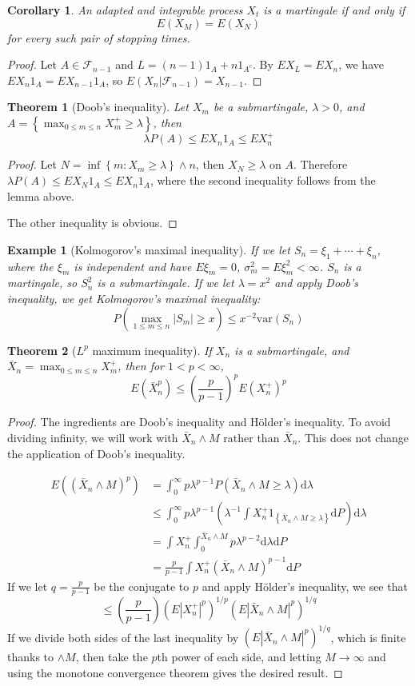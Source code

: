 \documentclass{article}
\newtheorem{Thm}{Theorem}[section]
\newtheorem{Cor}{Corollary}[Thm]
\newtheorem{Eg}{Example}[section]
\theoremstyle{definition}
\begin{document}
\begin{Cor}
    An adapted and integrable process $X_t$ is a martingale if and only if 
    \[E(X_M)=E(X_N)\] 
    for every such pair of stopping times.
\end{Cor}
\begin{proof}
    Let $A\in\mathcal{F}_{n-1}$ and $L=(n-1)1_A+n1_{A^c}$. By $EX_L=EX_n$, we have $EX_n1_A=EX_{n-1}1_A$,
    so $E(X_n|\mathcal{F}_{n-1})=X_{n-1}$.
\end{proof}


\begin{Thm}[Doob's inequality]
Let $X_m$ be a submartingale, $\lambda>0$, and $A=\left\{ \max_{0\le m\le n}X_m^+  \ge\lambda\right\}$, then \[\lambda P(A)\le EX_n1_A\le EX_n^+\]
\end{Thm}
\begin{proof}
Let $N=\inf\left\{m:X_m\ge\lambda\right\}\wedge n$, then $X_N\ge\lambda$ on $A$. Therefore $\lambda P(A)\le EX_N1_A\le EX_n1_A$, where the second inequality follows from the lemma above.\par
The other inequality is obvious.
\end{proof}
\begin{Eg}[Kolmogorov's maximal inequality]
If we let $S_n=\xi_1+\cdots+\xi_n$, where the $\xi_m$ is independent and have $E\xi_m=0$, $\sigma_m^2=E\xi_m^2<\infty$. $S_n$ is a martingale, so $S_n^2$ is a submartingale. If we let $\lambda=x^2$ and apply Doob's inequality, we get Kolmogorov's maximal inequality: \[P(\max_{1\le m\le n}\left|S_m\right|\ge x)\le x^{-2}\text{var}(S_n)\]
\end{Eg}
\begin{Thm}[$L^p$ maximum inequality]
If $X_n$ is a submartingale, and $\bar{X}_n= \max_{0\le m\le n}X_m^+$, then for $1<p<\infty$, \[E(\bar{X}_n^p)\le (\frac{p}{p-1})^pE(X_n^+)^p\]
\end{Thm}
\begin{proof}
The ingredients are  Doob's inequality and H\"older's inequality. 
To avoid dividing infinity, we will work with $\bar{X}_n\wedge M$ rather than $\bar{X}_n$. This does not change the application of Doob's inequality.\par
\begin{align*}
E((\bar{X}_n\wedge M)^p)&=\int_0^\infty p\lambda^{p-1}P(\bar{X}_n\wedge M\ge \lambda)\mathrm{d}\lambda\\
&\le \int_0^\infty p\lambda^{p-1}(\lambda^{-1}\int X_n^+1_{\left \{ \bar{X}_n\wedge M\ge\lambda \right \} }\mathrm{d}P)\mathrm{d}\lambda\\
&=\int X_n^+\int_0^{\bar{X}_n\wedge M}p\lambda^{p-2}\mathrm{d}\lambda\mathrm{d}P\\
&=\frac{p}{p-1}\int X_n^+(\bar{X}_n\wedge M)^{p-1}\mathrm{d}P
\end{align*}
If we let $q=\frac{p}{p-1}$ be the conjugate to $p$ and apply H\"older's inequality, we see that \[\le (\frac{p}{p-1})(E\left|X_n^+\right|^p)^{1/p}(E\left|\bar{X}_n\wedge M\right|^p)^{1/q}\]
If we divide both sides of the last inequality by $(E\left|\bar{X}_n\wedge M\right|^p)^{1/q}$, which is finite thanks to $\wedge M$, then take the $p$th power of each side, and letting $M\to\infty$ and using the monotone convergence theorem gives the desired result.
\end{proof}
\end{document}
